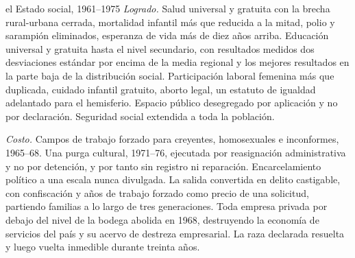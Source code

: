 \begin{ledger}{el Estado social, 1961--1975}
\emph{Logrado.} Salud universal y gratuita con la brecha rural-urbana cerrada,
mortalidad infantil más que reducida a la mitad, polio y sarampión eliminados,
esperanza de vida más de diez años arriba. Educación universal y gratuita hasta
el nivel secundario, con resultados medidos dos desviaciones estándar por encima
de la media regional y los mejores resultados en la parte baja de la distribución
social. Participación laboral femenina más que duplicada, cuidado infantil
gratuito, aborto legal, un estatuto de igualdad adelantado para el hemisferio.
Espacio público desegregado por aplicación y no por declaración. Seguridad social
extendida a toda la población.

\emph{Costo.} Campos de trabajo forzado para creyentes, homosexuales e
inconformes, 1965--68. Una purga cultural, 1971--76, ejecutada por reasignación
administrativa y no por detención, y por tanto sin registro ni reparación.
Encarcelamiento político a una escala nunca divulgada. La salida convertida en
delito castigable, con confiscación y años de trabajo forzado como precio de una
solicitud, partiendo familias a lo largo de tres generaciones. Toda empresa
privada por debajo del nivel de la bodega abolida en 1968, destruyendo la
economía de servicios del país y su acervo de destreza empresarial. La raza
declarada resuelta y luego vuelta inmedible durante treinta años.
\end{ledger}
